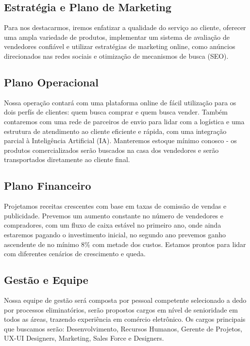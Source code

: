 \documentclass[
	12pt,				%
	openright,			%
	twoside,			%
	a4paper,			%
	english,			%
	brazil				%
	]{abntex2}
\begin{document}
\subsection{Estratégia e Plano de Marketing}

Para nos destacarmos, iremos enfatizar a qualidade do serviço ao cliente, oferecer uma ampla variedade de produtos, implementar um sistema de avaliação de vendedores confiável e utilizar estratégias de marketing online, como anúncios direcionados nas redes sociais e otimização de mecanismos de busca (SEO).

\subsection{Plano Operacional}

Nossa operação contará com uma plataforma online de fácil utilização para os dois perfís de clientes: quem busca comprar e quem busca vender. Também contaremos com uma rede de parceiros de envio para lidar com a logística e uma estrutura de atendimento ao cliente eficiente e rápida, com uma integração parcial à Inteligência Artificial (IA). Manteremos estoque mínimo conosco - os produtos comercializados serão buscados na casa dos vendedores e serão transportados diretamente ao cliente final.

\subsection{Plano Financeiro}

Projetamos receitas crescentes com base em taxas de comissão de vendas e publicidade. Prevemos um aumento constante no número de vendedores e compradores, com um fluxo de caixa estável no primeiro ano, onde ainda estaremos pagando o investimento inicial, no segundo ano prevemos ganho ascendente de no mínimo 8\% com metade dos custos. Estamos prontos para lidar com diferentes cenários de crescimento e queda.

\subsection{Gestão e Equipe}

Nossa equipe de gestão será composta por pessoal competente selecionado a dedo por processos eliminatórios, serão propostos cargos em nível de senioridade em todos as áreas, trazendo experiência em comércio eletrônico. Os cargos principais que buscamos serão: Desenvolvimento, Recursos Humanos, Gerente de Projetos, UX-UI Designers, Marketing, Sales Force e Designers.
\end{document}
